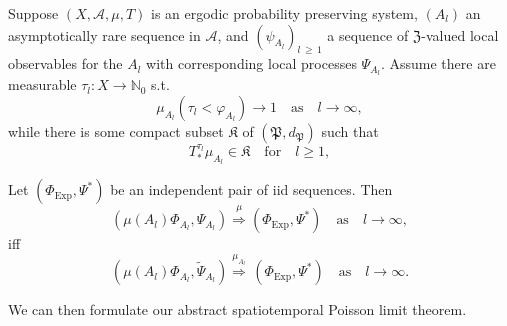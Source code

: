 \documentclass[AHL,Unicode,longabstracts]{cedram}
\newcommand{\clA}{\mathcal{A}}
\newcommand{\Expl}{\mathrm{Exp}}
\newcommand{\frkK}{\mathfrak{K}}
\newcommand{\frkP}{\mathfrak{P}}
\newcommand{\frkZ}{\mathfrak{Z}}
\newcommand{\bbN}{\mathbb{N}}
\begin{document}
\begin{theo}\label{T_JointLimitProcMuVsMuA}
Suppose $(X,\clA,\mu,T)$ is an ergodic probability preserving system, $(A_{l})$ an asymptotically rare sequence in $\clA$, and $(\psi_{A_{l}})_{l\,\geq\,1}$ a sequence of $\frkZ$-valued local observables for the $A_{l}$ with corresponding local processes $\Psi_{A_{l}}$. Assume there are measurable $\tau _{l}:X\rightarrow\bbN_{0}$ s.t.
\begin{equation}\label{Eq_mnhjnggnfjfggnjf1}
\mu_{A_{l}}\left(\tau_{l}<\varphi_{A_{l}}\right) \longrightarrow 1\quad\text{as}\quad l\rightarrow\infty,
\end{equation}
while there is some compact subset $\frkK$ of $(\frkP,d_{\frkP})$ such that
\begin{equation}\label{Eq_mnhjnggnfjfggnjf2}
T_{\ast}^{\tau_{l}}\mu_{A_{l}}\in\frkK\quad \text{for}\quad l\geq1,
\end{equation}


Let $(\Phi_{\Expl},\Psi^{\ast})$ be an independent pair of iid sequences. Then
\begin{equation}
\left(\mu(A_{l})\Phi_{A_{l}},\Psi_{A_{l}}\right)\overset{\mu}{\Longrightarrow} \left(\Phi_{\Expl},\Psi^{\ast}\right)\quad\text{as}\quad l\rightarrow\infty,
\end{equation}
iff
\begin{equation}\label{Eq_jomiasanmimradldo}
\left(\mu(A_{l})\Phi_{A_{l}},\widetilde{\Psi}_{A_{l}}\right)\overset{\mu_{A_{l}} }{\Longrightarrow}\,\left(\Phi_{\Expl},\Psi^{\ast}\right)\quad\text{as}\quad l\rightarrow\infty.
\end{equation}
\end{theo}



We can then formulate our abstract spatiotemporal Poisson limit theorem.
\end{document}
